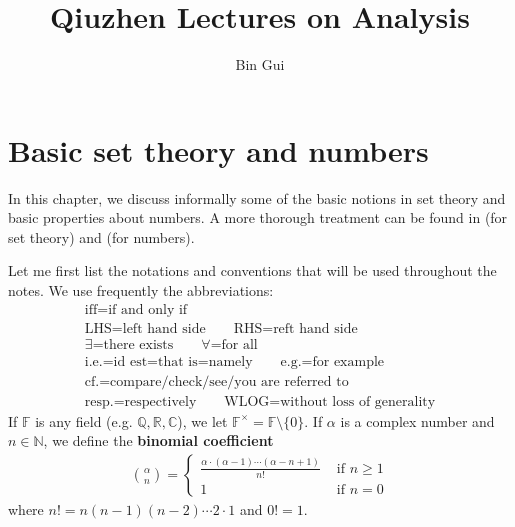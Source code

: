 \documentclass[12pt,b5paper,notitlepage]{article}
\title{Qiuzhen Lectures on Analysis}
\author{{\sc Bin Gui}
}
\theoremstyle{definition}
\theoremstyle{plain}
\newcommand{\Cbb}{\mathbb C}
\newcommand{\Nbb}{\mathbb N}
\newcommand{\Qbb}{\mathbb Q}
\newcommand{\Rbb}{\mathbb R}
\newcommand{\Fbb}{\mathbb F}
\newcommand{\dps}{\displaystyle}
\numberwithin{equation}{section}
\begin{document}
\sloppy %
	\setcounter{page}{1}
	






	
	\maketitle



\makeatletter
\newcommand*{\toccontents}{}
\makeatother
\toccontents



	


\newpage

\section{Basic set theory and numbers}


In this chapter, we discuss informally some of the basic notions in set theory and basic properties about numbers. A more thorough treatment can be found in \cite[Ch. 1]{Mun} (for set theory) and \cite[Ch. 1]{Rud-P} (for numbers). 

Let me first list the notations and conventions that will be used throughout the notes. We use frequently the abbreviations:
\begin{gather*}
\text{iff=if and only if}\\
\text{LHS=left hand side}\qquad
\text{RHS=reft hand side}\\
\text{$\exists$=there exists}\qquad \text{$\forall$=for all}\\
\text{i.e.=id est=that is=namely}\qquad\text{e.g.=for example}\\
\text{cf.=compare/check/see/you are referred to}\\
\text{resp.=respectively}\qquad 
\text{WLOG=without loss of generality}
\end{gather*}
If $\Fbb$ is any field (e.g. $\Qbb,\Rbb,\Cbb$), we let $\Fbb^\times=\Fbb\setminus\{0\}$. \index{F@$\Fbb^\times=\Fbb\setminus\{0\}$} If $\alpha$ is a complex number and $n\in\Nbb$, we define the \textbf{binomial coefficient}
\begin{align}
{\alpha\choose n}=\left\{
\begin{array}{ll}
\dps\frac{\alpha\cdot(\alpha-1)\cdots (\alpha-n+1)}{n!} &\text{ if }n\geq 1\\[1ex]
1&\text{ if }n=0
\end{array}
\right.
\end{align}
where $n!=n(n-1)(n-2)\cdots 2\cdot 1$ and $0!=1$.
\end{document}
